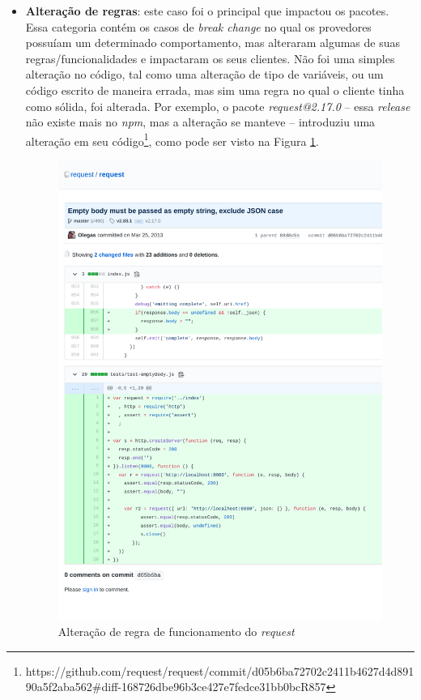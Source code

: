\begin{itemize}
    \item \textbf{Alteração de regras}: este caso foi o principal que impactou os pacotes. Essa categoria contém os casos de \textit{break change} no qual os provedores possuíam um determinado comportamento, mas alteraram algumas de suas regras/funcionalidades e impactaram os seus clientes. Não foi uma simples alteração no código, tal como uma alteração de tipo de variáveis, ou um código escrito de maneira errada, mas sim uma regra no qual o cliente tinha como sólida, foi alterada. Por exemplo, o pacote \textit{request@2.17.0} -- essa \textit{release} não existe mais no \textit{npm}, mas a alteração se manteve -- introduziu uma alteração em seu código\footnote{https://github.com/request/request/commit/d05b6ba72702c2411b4627d4d89190a5f2aba562\#diff-168726dbe96b3ce427e7fedce31bb0bcR857}, como pode ser visto na Figura \ref{fig:bc_category_change_rule_1}.

    \begin{figure}
        \centering
        \includegraphics{figuras/bc_category_change_rule_1.pdf}
        \caption{Alteração de regra de funcionamento do \textit{request}}
        \label{fig:bc_category_change_rule_1}
    \end{figure}{}


\end{itemize}
